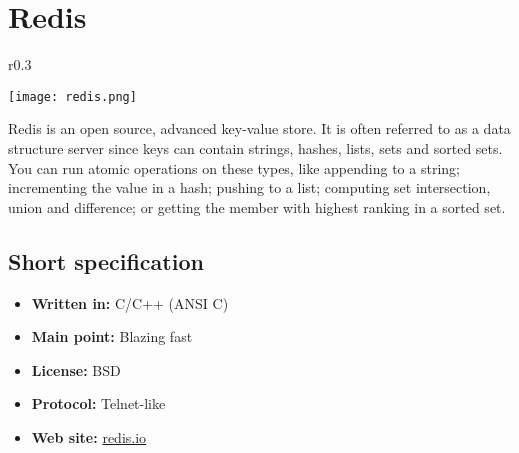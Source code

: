 \chapter{Redis}

\begin{wrapfigure}{r}{0.3\textwidth}
  \vspace{-42pt}
  \begin{center}
    \texttt{[image: redis.png]}
  \end{center}
  \vspace{-10pt}
\end{wrapfigure}
Redis is an open source, advanced key-value store. It is often referred to as a data structure server since keys can contain strings, hashes, lists, sets and sorted sets.
You can run atomic operations on these types, like appending to a string; incrementing the value in a hash; pushing to a list; computing set intersection, union and difference; or getting the member with highest ranking in a sorted set.

\section{Short specification}

\begin{itemize}
  \item \textbf{Written in:} C/C++ (ANSI C)
  \item \textbf{Main point:} Blazing fast
  \item \textbf{License:} BSD
  \item \textbf{Protocol:} Telnet-like
  \item \textbf{Web site:} \href{http://redis.io}{redis.io}
\end{itemize}